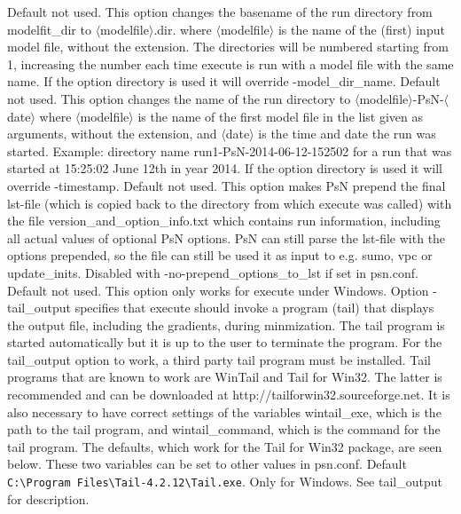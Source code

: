 \begin{optionlist}
Default not used. This option changes the basename of the run directory from modelfit\_dir to $\langle$modelfile$\rangle$.dir. where $\langle$modelfile$\rangle$ 
is the name of the (first) input model file, without the extension. 
The directories will be numbered starting from 1, increasing the number each time execute is run with a model file with the 
same name. If the option directory is used it will override -model\_dir\_name.
\nextopt
{}
Default not used. This option changes the name of the run directory to $\langle$modelfile$\rangle$-PsN-$\langle$date$\rangle$
where $\langle$modelfile$\rangle$ is the name of the first model file in the list given as arguments, without the extension,
and $\langle$date$\rangle$ is the time and date the run was started. 
Example: directory name run1-PsN-2014-06-12-152502 for a run that was started at 15:25:02 June 12th in year 2014.
If the option directory is used it will override -timestamp.
\nextopt
{}
Default not used. This option makes PsN prepend the final lst-file (which is copied back to the directory from which execute was called) with the file version\_and\_option\_info.txt which contains run information, including     all actual values of optional PsN options. PsN can still parse the lst-file with the options prepended, so the file can still be used it as input to e.g. sumo, vpc or update\_inits. Disabled with -no-prepend\_options\_to\_lst if set in psn.conf.
\nextopt
{}
Default not used. This option only works for execute under Windows. Option -tail\_output specifies that execute should invoke a program (tail) that displays the output file, including the gradients, during minmization. The tail program is started automatically but it is up to the user to terminate the program. For the tail\_output option to work, a third party tail program must be installed. Tail programs that are known to work are WinTail and Tail for Win32.  The latter is recommended and can be downloaded at http://tailforwin32.sourceforge.net. It is also necessary to have correct settings of the variables wintail\_exe, which is the path to the tail program, and wintail\_command, which is the command for the tail program. The defaults, which work for the Tail for Win32 package, are seen below. These two variables can be set to other values in psn.conf.
\nextopt
{}
Default \verb|C:\Program Files\Tail-4.2.12\Tail.exe|. Only for Windows. See tail\_output for description.

\end{optionlist}
